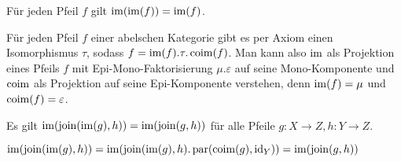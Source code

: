 \begin{korr}
Für jeden Pfeil $f$ gilt $\operatorname{im}(\operatorname{im}(f)) = \operatorname{im}(f)$.
\end{korr}

\begin{bem}
Für jeden Pfeil $f$ einer abelschen Kategorie gibt es per Axiom einen Isomorphismus $\tau$, sodass $f = \operatorname{im}(f).\tau.\operatorname{coim}(f)$.
Man kann also $\operatorname{im}$ als Projektion eines Pfeils $f$ mit Epi-Mono-Faktorisierung $\mu.\varepsilon$ auf seine Mono-Komponente und $\operatorname{coim}$ als Projektion auf seine Epi-Komponente verstehen, denn $\operatorname{im}(f) = \mu$ und $\operatorname{coim}(f) = \varepsilon$.

\end{bem}

\begin{prop} \label{im-join-im-elim}
Es gilt $\operatorname{im}(\operatorname{join}(\operatorname{im}(g),h)) = \operatorname{im}(\operatorname{join}(g,h))$ für alle Pfeile $g:X\to Z,h : Y\to Z$.
\end{prop}
\begin{bew}
$\operatorname{im}(\operatorname{join}(\operatorname{im}(g),h)) = \operatorname{im}(\operatorname{join}(\operatorname{im}(g),h).\operatorname{par}(\operatorname{coim}(g),\operatorname{id}_Y)) = \operatorname{im}(\operatorname{join}(g,h))$
\end{bew}
